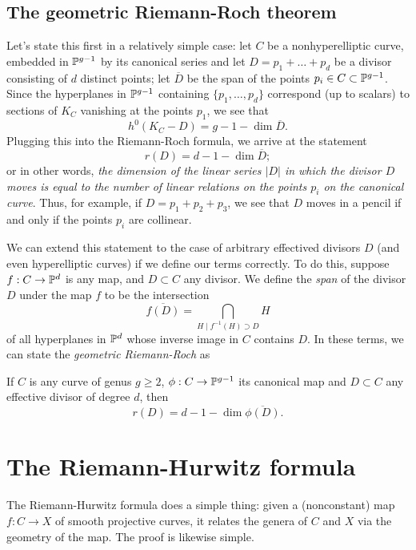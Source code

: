 \subsection{The geometric Riemann-Roch theorem}

Let's state this first in a relatively simple case: let $C$ be a nonhyperelliptic curve, embedded in ${\mathbb P}^{g-1}$ by its canonical series and let $D = p_1+\dots + p_d$ be a divisor consisting of $d$ distinct points; let $\overline D$ be the span of the points $p_i \in C \subset {\mathbb P}^{g-1}$. Since the hyperplanes in ${\mathbb P}^{g-1}$ containing $\{p_1,\dots,p_d\}$ correspond (up to scalars) to sections of $K_C$ vanishing at the points $p_1$, we see that
$$
h^0(K_C-D) = g - 1 - \dim \overline D.
$$
Plugging this into the Riemann-Roch formula, we arrive at the statement
$$
r(D) = d - 1 - \dim \overline D;
$$
or in other words, \emph{the dimension of the linear series $|D|$ in which the divisor $D$ moves is equal to the number of linear relations on the points $p_i$ on the canonical curve}. Thus, for example, if $D = p_1+p_2+p_3$, we see that $D$ moves in a pencil if and only if the points $p_i$ are collinear.

We can extend this statement to the case of arbitrary effectived divisors $D$ (and even hyperelliptic curves) if we define our terms correctly. To do this, suppose $f : C \to {\mathbb P}^d$ is any map, and $D \subset C$ any divisor. We define the \emph{span} of the divisor $D$ under the map $f$ to be the intersection
$$
\overline{f(D)} = \bigcap_{H \mid f^{-1}(H)\supset D} H 
$$
of all hyperplanes in ${\mathbb P}^d$ whose inverse image in $C$ contains $D$. In these terms, we can state the \emph{geometric Riemann-Roch} as

\begin{theorem}
If $C$ is any curve of genus $g \geq 2$,  $\phi : C \to {\mathbb P}^{g-1}$ its canonical map and $D \subset C$ any effective divisor of degree $d$, then
$$
r(D) = d - 1 - \dim \overline{\phi(D)}.
$$
\end{theorem}

 \section{The Riemann-Hurwitz formula}
 
 The Riemann-Hurwitz formula does a simple thing: given a (nonconstant) map $f : C \to X$ of smooth projective curves, it relates the genera of $C$ and $X$ via the geometry of the map. The proof is likewise simple.
 
